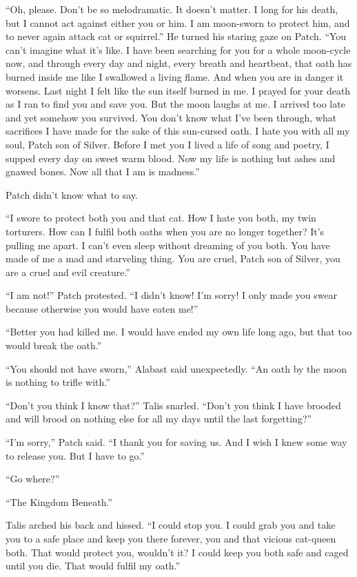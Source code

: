 \documentclass[ebook,oneside,openany,17pt]{memoir}
\begin{document}
“Oh, please. Don’t be so melodramatic. It doesn’t matter. I long for
his death, but I cannot act against either you or him. I am moon-sworn
to protect him, and to never again attack cat or squirrel.” He turned
his staring gaze on Patch. “You can’t imagine what it’s like. I have
been searching for you for a whole moon-cycle now, and through every
day and night, every breath and heartbeat, that oath has burned inside
me like I swallowed a living flame. And when you are in danger it
worsens. Last night I felt like the sun itself burned in me. I prayed
for your death as I ran to find you and save you. But the moon laughs
at me. I arrived too late and yet somehow you survived. You don’t know
what I’ve been through, what sacrifices I have made for the sake of
this sun-cursed oath. I hate you with all my soul, Patch son of
Silver. Before I met you I lived a life of song and poetry, I supped
every day on sweet warm blood. Now my life is nothing but ashes and
gnawed bones. Now all that I am is madness.”

Patch didn’t know what to say.

“I swore to protect both you and that cat. How I hate you both, my
twin torturers. How can I fulfil both oaths when you are no longer
together? It’s pulling me apart. I can’t even sleep without dreaming
of you both. You have made of me a mad and starveling thing. You are
cruel, Patch son of Silver, you are a cruel and evil creature.”

“I am not!” Patch protested. “I didn’t know! I’m sorry! I only made
you swear because otherwise you would have eaten me!”

“Better you had killed me. I would have ended my own life long ago,
but that too would break the oath.”

“You should not have sworn,” Alabast said unexpectedly. “An oath by
the moon is nothing to trifle with.”

“Don’t you think I know that?” Talis snarled. “Don’t you think I have
brooded and will brood on nothing else for all my days until the last
forgetting?”

“I’m sorry,” Patch said. “I thank you for saving us. And I wish I knew
some way to release you. But I have to go.”

“Go where?”

“The Kingdom Beneath.”

Talis arched his back and hissed. “I could stop you. I could grab you
and take you to a safe place and keep you there forever, you and that
vicious cat-queen both. That would protect you, wouldn’t it? I could
keep you both safe and caged until you die. That would fulfil my
oath.”
\end{document}
